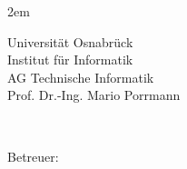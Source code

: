 \begin{titlepage}
\selectfont
\leftskip2em

\hfill
\begin{minipage}[t]{0.4\textwidth}
\begin{flushright}
Universität Osnabrück\\
Institut für Informatik \\
AG Technische Informatik \\
Prof. Dr.-Ing. Mario Porrmann     
\end{flushright}
\end{minipage}

\vfill

{\selectfont 
\Large \thesisType\\
\Huge \thesisTitle
\begin{flushright}
\Large \thesisAuthor
\end{flushright}
}

\vfill

\normalsize
\begin{minipage}[t]{5em}
Betreuer:\quad
\end{minipage}
\begin{minipage}[t]{0.5\textwidth}
\thesisSupervisor
\end{minipage}

\vfill

\thesisDate
\hfill
\thesisId

\enlargethispage{2\baselineskip}

\end{titlepage}